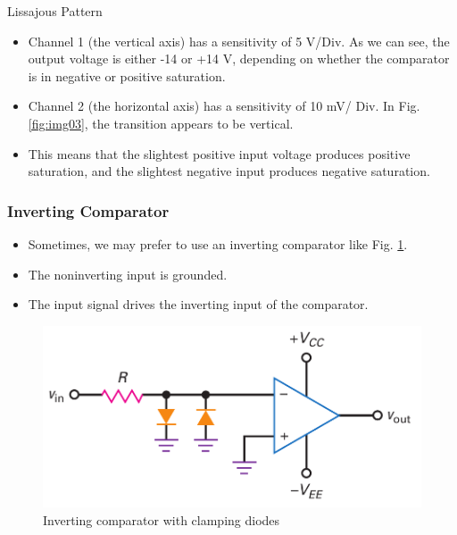 \documentclass[pdflatex,compress]{beamer}
\begin{document}
\begin{frame}{Lissajous Pattern}
	\begin{itemize}
		\item Channel 1 (the vertical axis) has a sensitivity of 5 V/Div. As
		we can see, the output voltage is either -14 or +14 V, depending on whether the comparator is in negative or positive saturation.
		\item Channel 2 (the horizontal axis) has a sensitivity of 10 mV/ Div. In
		Fig. \ref{fig:img03}, the transition appears to be vertical.
		\item This means that the slightest positive input voltage produces positive saturation, and the slightest negative input produces negative saturation.
	\end{itemize}
\end{frame}

\begin{frame}
	\frametitle{Inverting Comparator}
	\begin{multicols}{2}
		\begin{itemize}
			\item Sometimes, we may prefer to use an inverting comparator like Fig. \ref{fig:img04}.
			\item The noninverting input is grounded.
			\item The input signal drives the inverting input of the comparator.
		\end{itemize}
			\begin{figure}
			\centering
			\includegraphics[width=\linewidth]{img/img04}
			\caption{Inverting comparator with clamping diodes}
			\label{fig:img04}
		\end{figure}
	\end{multicols}
\end{frame}
		
\end{document}
